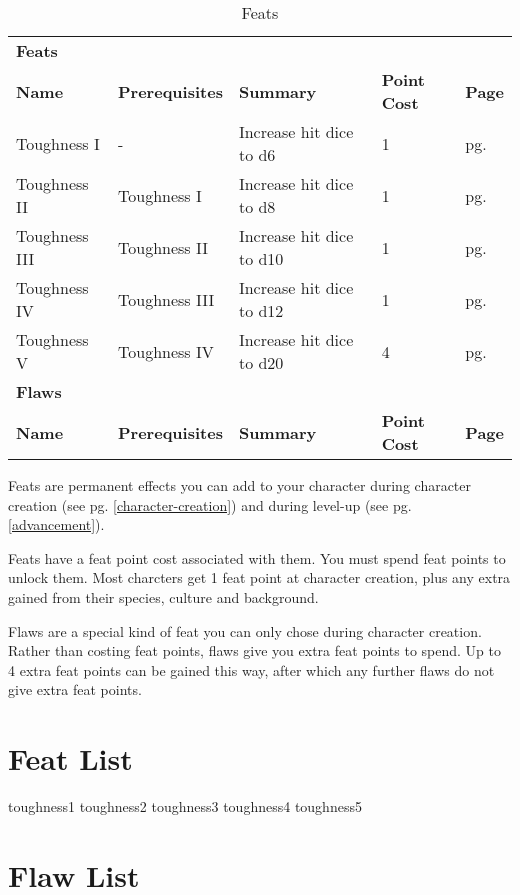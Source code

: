 \begin{multicols*}{2}
    \begin{table*}[ht]
        \unclassedrowcolors
        \begin{tabularx}{\textwidth}{l X X l l}
            \multicolumn{5}{l}{\textbf{Feats}} \\
            \textbf{Name} & \textbf{Prerequisites} & \textbf{Summary} & \textbf{Point Cost} & \textbf{Page} \\
            Toughness I & - & Increase hit dice to d6 & 1 & pg. \pageref{feat:toughness1} \\
            Toughness II & Toughness I & Increase hit dice to d8 & 1 & pg. \pageref{feat:toughness2} \\
            Toughness III & Toughness II & Increase hit dice to d10 & 1 & pg. \pageref{feat:toughness3} \\
            Toughness IV & Toughness III & Increase hit dice to d12 & 1 & pg. \pageref{feat:toughness4} \\
            Toughness V & Toughness IV & Increase hit dice to d20 & 4 & pg. \pageref{feat:toughness5} \\
            \multicolumn{5}{l}{\textbf{Flaws}} \\
            \textbf{Name} & \textbf{Prerequisites} & \textbf{Summary} & \textbf{Point Cost} & \textbf{Page} \\
        \end{tabularx}
        \caption{Feats}
        \label{tab:feats}
    \end{table*}

    Feats are permanent effects you can add to your character during character
    creation (see pg. \ref{character-creation}) and during level-up (see pg.
    \ref{advancement}).

    Feats have a feat point cost associated with them. You must spend feat
    points to unlock them. Most charcters get 1 feat point at character
    creation, plus any extra gained from their species, culture and background.

    Flaws are a special kind of feat you can only chose during character
    creation. Rather than costing feat points, flaws give you extra feat
    points to spend. Up to 4 extra feat points can be gained this way, after
    which any further flaws do not give extra feat points.

    \section{Feat List}
    {toughness1}
    {toughness2}
    {toughness3}
    {toughness4}
    {toughness5}

    \section{Flaw List}
\end{multicols*}

